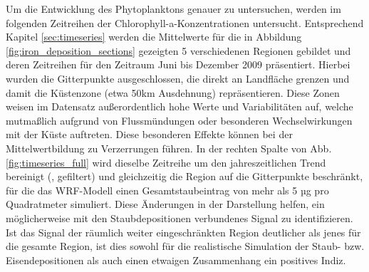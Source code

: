 \documentclass[12pt,a4paper,onecolumn]{scrartcl}
\begin{document}
Um die Entwicklung des Phytoplanktons genauer zu untersuchen, werden im folgenden Zeitreihen der Chlorophyll-a-Konzentrationen untersucht. Entsprechend Kapitel \ref{sec:timeseries} werden die Mittelwerte für die in Abbildung \ref{fig:iron_deposition_sections} gezeigten 5 verschiedenen Regionen gebildet und deren Zeitreihen für den Zeitraum Juni bis Dezember 2009 präsentiert. Hierbei wurden die Gitterpunkte ausgeschlossen, die direkt an Landfläche grenzen und damit die Küstenzone (etwa 50km Ausdehnung) repräsentieren. Diese Zonen weisen im Datensatz außerordentlich hohe Werte und Variabilitäten auf, welche mutmaßlich aufgrund von Flussmündungen oder besonderen Wechselwirkungen mit der Küste auftreten. Diese besonderen Effekte können bei der Mittelwertbildung zu Verzerrungen führen. In der rechten Spalte von Abb. \ref{fig:timeseries_full} wird dieselbe Zeitreihe um den jahreszeitlichen Trend bereinigt (, gefiltert) und gleichzeitig die Region auf die Gitterpunkte beschränkt, für die das WRF-Modell einen Gesamtstaubeintrag von mehr als 5 µg pro Quadratmeter simuliert. Diese Änderungen in der Darstellung helfen, ein möglicherweise mit den Staubdepositionen verbundenes Signal zu identifizieren. Ist das Signal der räumlich weiter eingeschränkten Region deutlicher als jenes für die gesamte Region, ist dies sowohl für die realistische Simulation der Staub- bzw. Eisendepositionen als auch einen etwaigen Zusammenhang ein positives Indiz. 
\end{document}
